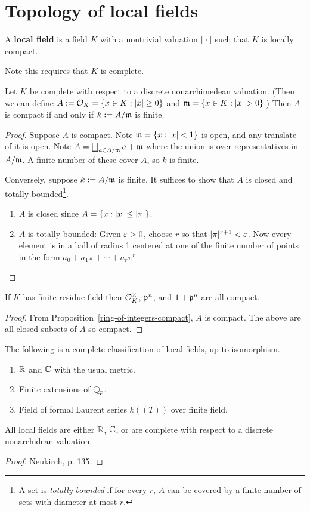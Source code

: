 \section{Topology of local fields}
\begin{df}
A \textbf{local field} is a field $K$ with a nontrivial valuation $|\cdot|$ such that $K$ is locally compact.
\end{df}
Note this requires that $K$ is complete.
\begin{pr}
Let $K$ be complete with respect to a discrete nonarchimedean valuation. (Then we can define $A:=\mathcal{O}_K=\left\{{x\in K}:{|x|\ge 0}\right\}$ and $\mm = \set{x\in K}{|x|>0}$.) Then $A$ is compact if and only if $k:=A/\mathfrak{m}$ is finite.
\end{pr}
\begin{proof}
Suppose $A$ is compact.
Note $\mathfrak{m}=\left\{{x}:{|x|<1}\right\}$ is open, and any translate of it is open. Note $A=\bigsqcup_{a\in A/\mathfrak{m}} a+\mathfrak{m}$ where the union is over representatives in $A/\mathfrak{m}$. A finite number of these cover $A$, so $k$ is finite.

Conversely, suppose $k:=A/\mathfrak{m}$ is finite. It suffices to show that $A$ is closed and totally bounded\footnote{A set is {\it totally bounded} if for every $r$, $A$ can be covered by a finite number of sets with diameter at most $r$.}.
\begin{enumerate}
\item $A$ is closed since $A=\left\{{x}:{|x|\le |\pi|}\right\}$.
\item $A$ is totally bounded: Given $\varepsilon>0$, choose $r$ so that $|\pi|^{r+1}<\varepsilon$. Now every element is in a ball of radius 1 centered at one of the finite number of points in the form $a_0+a_1\pi+\cdots+a_r\pi^r$. \qedhere
\end{enumerate}
\end{proof}
\begin{pr}
If $K$ has finite residue field then $\mathcal{O}_K^{\times}$, $\mathfrak{p}^n$, and $1+\mathfrak{p}^n$ are all compact.
\end{pr}
\begin{proof}
From Proposition~\ref{ring-of-integers-compact}, $A$ is compact. The above are all closed subsets of $A$ so compact.
\end{proof}

\begin{thm}
The following is a complete classification of local fields, up to isomorphism.
\begin{enumerate}
\item $\mathbb{R}$ and $\mathbb{C}$ with the usual metric.
\item Finite extensions of $\mathbb{Q}_p$.
\item Field of formal Laurent series $k((T))$ over finite field.
\end{enumerate}
\end{thm}
All local fields are either $\mathbb{R}$, $\mathbb{C}$, or are complete with respect to a discrete nonarchidean valuation.
\begin{proof}
Neukirch, p. 135.
\end{proof}
%
